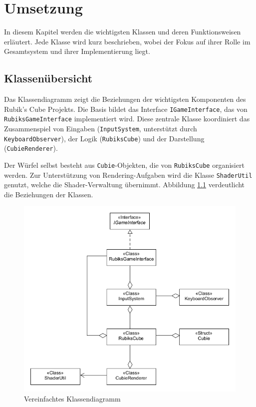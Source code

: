 \chapter{Umsetzung}
In diesem Kapitel werden die wichtigsten Klassen und deren Funktionsweisen erläutert. Jede Klasse wird kurz beschrieben, wobei der Fokus auf ihrer Rolle im Gesamtsystem und ihrer Implementierung liegt.

\section{Klassenübersicht}
Das Klassendiagramm zeigt die Beziehungen der wichtigsten Komponenten des Rubik's Cube Projekts. Die Basis bildet das Interface \texttt{IGameInterface}, das von \texttt{RubiksGameInterface} implementiert wird. Diese zentrale Klasse koordiniert das Zusammenspiel von Eingaben (\texttt{InputSystem}, unterstützt durch \texttt{KeyboardObserver}), der Logik (\texttt{RubiksCube}) und der Darstellung (\texttt{CubieRenderer}).

Der Würfel selbst besteht aus \texttt{Cubie}-Objekten, die von \texttt{RubiksCube} organisiert werden. Zur Unterstützung von Rendering-Aufgaben wird die Klasse \texttt{ShaderUtil} genutzt, welche die Shader-Verwaltung übernimmt. Abbildung \ref{SimpleClassDia} verdeutlicht die Beziehungen der Klassen.

\begin{figure} [H]
	\centering
	\includegraphics[scale=0.6]{images/SimpleClassDia.png}
	\caption{Vereinfachtes Klassendiagramm}
	\label{SimpleClassDia}
\end{figure}

